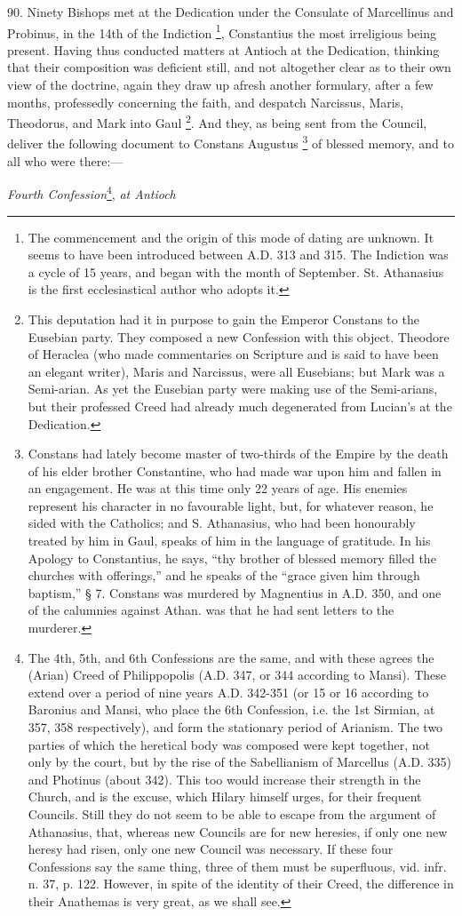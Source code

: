 90. Ninety Bishops met at the
Dedication under the Consulate of Marcellinus and Probinus, in the
14th of the Indiction \footnote{The commencement and the origin of this mode of dating are unknown. It
seems to have been introduced between A.D.
313 and 315. The Indiction was a cycle of 15 years, and began with the
month of September. St. Athanasius is the first ecclesiastical author
who adopts it.},
Constantius the most irreligious being present. Having thus conducted
matters at Antioch at the Dedication, thinking that their composition
was deficient still, and not altogether clear as to their own
view of the doctrine, again they draw up afresh another formulary,
after a few months, professedly concerning the faith, and despatch
Narcissus, Maris, Theodorus, and Mark into Gaul \footnote{This deputation had it in purpose to gain the Emperor Constans to the
Eusebian party. They composed a new Confession with this object.
Theodore of Heraclea (who made commentaries on Scripture and is said
to have been an elegant writer), Maris and Narcissus, were all
Eusebians; but Mark was a Semi-arian. As yet the Eusebian party were
making use of the Semi-arians, but their professed Creed had already
much degenerated from Lucian's at the Dedication.}. And they, as being sent from the Council, deliver the
following document to Constans Augustus \footnote{Constans had lately become master of two-thirds of the Empire by the
death of his elder brother Constantine, who had made war upon him and
fallen in an engagement. He was at this time only 22 years of age. His
enemies represent his character in no favourable light, but, for
whatever reason, he sided with the Catholics; and S. Athanasius, who
had been honourably treated by him in Gaul, speaks of him in the
language of gratitude. In his Apology to Constantius, he says, ``thy
brother of blessed memory filled the churches with offerings,''
and he speaks of the ``grace given him through baptism,'' § 7. Constans
was murdered by Magnentius in A.D.
350, and one of the calumnies against Athan. was that he had sent
letters to the murderer.} of blessed memory, and to all who were there:—

\emph{Fourth
Confession}\footnote{The 4th, 5th, and 6th Confessions are the same, and with these agrees
the (Arian) Creed of Philippopolis (A.D.
347, or 344 according to Mansi). These extend over a period of nine
years A.D. 342-351 (or 15 or 16 according to
Baronius and Mansi, who place the 6th Confession, i.e. the 1st Sirmian,
at 357, 358 respectively), and form the stationary period of Arianism.
The two parties of which the heretical body was composed were kept
together, not only by the court, but by the rise of the Sabellianism
of Marcellus (A.D.
335) and Photinus (about 342). This too would increase their strength
in the Church, and is the excuse, which Hilary himself urges, for
their frequent Councils. Still they do not seem to be able to escape
from the argument of Athanasius, that, whereas new Councils are for
new heresies, if only one new heresy had risen, only one new Council
was necessary. If these four Confessions say the same thing, three of
them must be superfluous, vid. infr. n. 37, p. 122. However, in spite
of the identity of their Creed, the difference in their Anathemas is
very great, as we shall see.}, \emph{at Antioch}

